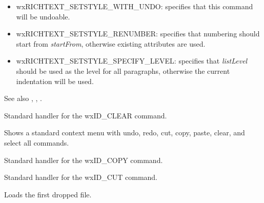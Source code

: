 \begin{itemize}\itemsep=0pt
\item wxRICHTEXT\_SETSTYLE\_WITH\_UNDO: specifies that this command will be undoable.
\item wxRICHTEXT\_SETSTYLE\_RENUMBER: specifies that numbering should start from {\it startFrom}, otherwise existing attributes are used.
\item wxRICHTEXT\_SETSTYLE\_SPECIFY\_LEVEL: specifies that {\it listLevel} should be used as the level for all paragraphs, otherwise the current indentation will be used.
\end{itemize}

See also , , .

\label{wxrichtextctrlonclear}


Standard handler for the wxID\_CLEAR command.

\label{wxrichtextctrloncontextmenu}


Shows a standard context menu with undo, redo, cut, copy, paste, clear, and select all commands.

\label{wxrichtextctrloncopy}


Standard handler for the wxID\_COPY command.

\label{wxrichtextctrloncut}


Standard handler for the wxID\_CUT command.

\label{wxrichtextctrlondropfiles}


Loads the first dropped file.

\label{wxrichtextctrlonpaste}


